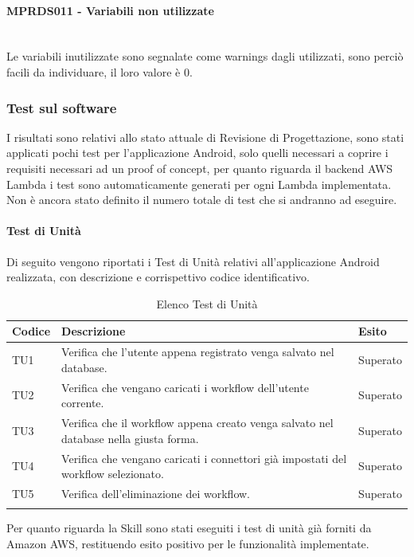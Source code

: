 \paragraph{MPRDS011 - Variabili non utilizzate}\mbox{}\\[0.4cm]
Le variabili inutilizzate sono segnalate come warnings dagli  utilizzati, sono perciò facili da individuare, il loro valore è 0.
\subsubsection{Test sul software}
I risultati sono relativi allo stato attuale di Revisione di Progettazione, sono stati applicati pochi test per l'applicazione Android, solo quelli necessari a coprire i requisiti necessari ad un proof of concept, per quanto riguarda il backend AWS Lambda i test sono automaticamente generati per ogni Lambda implementata. Non è ancora stato definito il numero totale di test che si andranno ad eseguire.
\paragraph{Test di Unità}
\label{sec:tuRP}
Di seguito vengono riportati i Test di Unità relativi all'applicazione Android realizzata, con descrizione e corrispettivo codice identificativo.
\begin{center}
	\centering
	\renewcommand{\arraystretch}{1.5}
	\begin{longtable}{  p{1.5cm}  p{10.5cm} p{2cm}  }
		\rowcolor{tableHeadYellow}
		\textbf{Codice}   & \textbf{Descrizione} & \textbf{Esito} \\ 
		\endhead
		TU1 & Verifica che l’utente appena registrato venga salvato nel database.  & Superato \\
		TU2 & Verifica che vengano caricati i workflow dell’utente corrente. & Superato \\
		TU3 & Verifica che il workflow appena creato venga salvato nel database nella giusta forma. & Superato \\
		TU4 & Verifica che vengano caricati i connettori già impostati del workflow selezionato. & Superato \\
		TU5 & Verifica dell’eliminazione dei workflow. & Superato \\
		\rowcolor{white}
		\caption{Elenco Test di Unità}
	\end{longtable}
\end{center}
Per quanto riguarda la Skill sono stati eseguiti i test di unità già forniti da Amazon AWS, restituendo esito positivo per le funzionalità implementate.
\pagebreak

